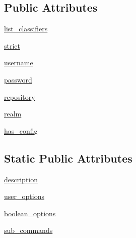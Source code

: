 \subsection*{Public Attributes}
\begin{DoxyCompactItemize}
\item 
\hyperlink{classsetuptools_1_1__distutils_1_1command_1_1register_1_1register_a305ecae36140148929cad1a2ec89e657}{list\+\_\+classifiers}
\item 
\hyperlink{classsetuptools_1_1__distutils_1_1command_1_1register_1_1register_ad4db73f0176f71c9c405536bcd636eb9}{strict}
\item 
\hyperlink{classsetuptools_1_1__distutils_1_1command_1_1register_1_1register_a7c504b9729dcea5abf66fbcf8343dd1c}{username}
\item 
\hyperlink{classsetuptools_1_1__distutils_1_1command_1_1register_1_1register_aaa3a52b8aa66aa68830a57d3131574fe}{password}
\item 
\hyperlink{classsetuptools_1_1__distutils_1_1command_1_1register_1_1register_aab886ed41331da421ed347478207908e}{repository}
\item 
\hyperlink{classsetuptools_1_1__distutils_1_1command_1_1register_1_1register_a31893855f33b23f7609bee213f192b3b}{realm}
\item 
\hyperlink{classsetuptools_1_1__distutils_1_1command_1_1register_1_1register_a1418a702876c2ec3c2b2235cca1c120b}{has\+\_\+config}
\end{DoxyCompactItemize}
\subsection*{Static Public Attributes}
\begin{DoxyCompactItemize}
\item 
\hyperlink{classsetuptools_1_1__distutils_1_1command_1_1register_1_1register_ace20c28139e113a7715ae80d9beddf56}{description}
\item 
\hyperlink{classsetuptools_1_1__distutils_1_1command_1_1register_1_1register_acfa9cb5c35ad6e28e6b0a018091c45fa}{user\+\_\+options}
\item 
\hyperlink{classsetuptools_1_1__distutils_1_1command_1_1register_1_1register_a92c68136d2a22fdebf00f0d6557a5f53}{boolean\+\_\+options}
\item 
\hyperlink{classsetuptools_1_1__distutils_1_1command_1_1register_1_1register_a287cc48aabbef252713064a5ed45edd1}{sub\+\_\+commands}
\end{DoxyCompactItemize}


